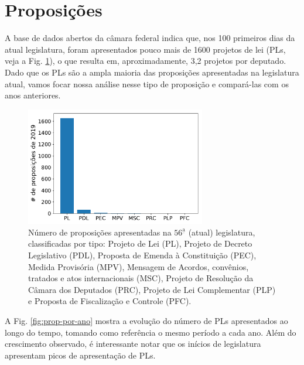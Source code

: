 \documentclass[12pt,a4paper]{article}
\begin{document}
\section{Proposições}

A base de dados abertos da câmara federal indica que, nos 100 primeiros dias da atual legislatura,
foram apresentados pouco mais de 1600 projetos de lei (PLs, veja a Fig. \ref{fig:prop-2019-tipo}),
o que resulta em, aproximadamente, 3,2 projetos por deputado. Dado que os PLs são a ampla maioria
das proposições apresentadas na legislatura atual, vamos focar nossa análise nesse tipo de proposição e
compará-las com os anos anteriores.

\begin{figure}[t]
\centering
\includegraphics[width=0.7\textwidth]{graficos/proposicoes-2019-por-tipo_2019-05-01.pdf}
\caption{Número de proposições apresentadas na $56^{\mathrm{\underline{a}}}$ (atual) legislatura,
  classificadas por tipo: Projeto de Lei (PL), Projeto de Decreto Legislativo (PDL),
  Proposta de Emenda à Constituição (PEC), Medida Provisória (MPV), Mensagem de Acordos,
  convênios, tratados e atos internacionais (MSC), Projeto de Resolução da Câmara dos Deputados (PRC),
  Projeto de Lei Complementar (PLP) e Proposta de Fiscalização e Controle (PFC).}
\label{fig:prop-2019-tipo}
\end{figure} 

A Fig. \ref{fig:prop-por-ano} mostra a evolução do número de PLs apresentados ao longo do tempo,
tomando como referência o mesmo período a cada ano. Além do crescimento observado, é interessante
notar que os inícios de legislatura apresentam picos de apresentação de PLs.
\end{document}

